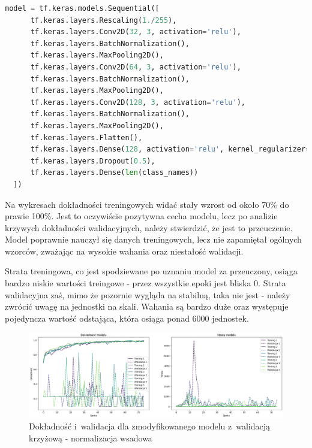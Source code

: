 \begin{lstlisting}[language=Python,caption=Listing zmodyfikowanego skryptu tworzącego model z~walidacją krzyżową - wersja 2,
	label={tests-model-crossval2}]
	model = tf.keras.models.Sequential([
      tf.keras.layers.Rescaling(1./255),
      tf.keras.layers.Conv2D(32, 3, activation='relu'),
      tf.keras.layers.BatchNormalization(),
      tf.keras.layers.MaxPooling2D(),
      tf.keras.layers.Conv2D(64, 3, activation='relu'),
      tf.keras.layers.BatchNormalization(),
      tf.keras.layers.MaxPooling2D(),
      tf.keras.layers.Conv2D(128, 3, activation='relu'),
      tf.keras.layers.BatchNormalization(),
      tf.keras.layers.MaxPooling2D(),
      tf.keras.layers.Flatten(),
      tf.keras.layers.Dense(128, activation='relu', kernel_regularizer=tf.keras.regularizers.l2(0.01)),
      tf.keras.layers.Dropout(0.5),
      tf.keras.layers.Dense(len(class_names))
  ])
\end{lstlisting}

Na wykresach dokładności treningowych widać stały wzrost od około 70\% do prawie 100\%.
Jest to oczywiście pozytywna cecha modelu, lecz po analizie krzywych dokładności walidacyjnych,
należy stwierdzić, że jest to przeuczenie. Model poprawnie nauczył się danych treningowych,
lecz nie zapamiętał ogólnych wzorców, zważając na wysokie wahania oraz niestałość walidacji.

Strata treningowa, co jest spodziewane po uznaniu model za przeuczony,
osiąga bardzo niskie wartości treingowe - przez wszystkie epoki jest bliska 0.
Strata walidacyjna zaś, mimo że pozornie wygląda na stabilną, taka nie jest
- należy zwrócić uwagę na jednostki na skali. Wahania są bardzo duże oraz występuje pojedyncza wartość odstająca,
która osiąga ponad 6000 jednostek.

\begin{figure}[ht]
	\centering
	\includegraphics[width=15.5cm]{resources/tests/images/v4/crossvalid_2_img.png}
	\caption{Dokładność i~walidacja dla zmodyfikowanego modelu z~walidacją krzyżową - normalizacja wsadowa}
	\label{Fig:tests-cv-2a}
\end{figure}
\FloatBarrier

